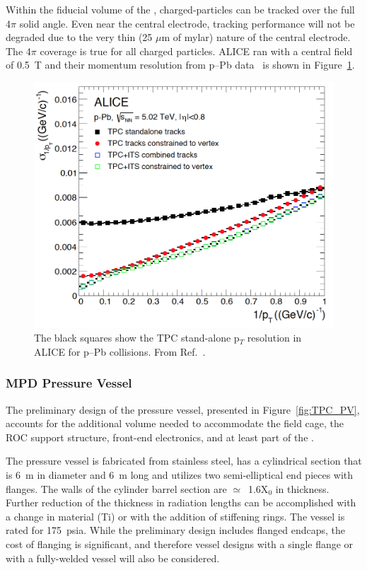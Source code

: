 Within the fiducial volume of the , charged-particles can be tracked over the full 4$\pi$ solid angle.  Even near the central electrode,  tracking performance will not be degraded due to the very thin (25 $\mu$m of mylar) nature of the central electrode.  The 4$\pi$ coverage is true for all charged particles.  ALICE ran with a central field of 0.5~T and their momentum resolution from p--Pb data~\cite{Abelev:2014ffa} is shown in Figure~\ref{fig:ALICE_MOMres}.

\begin{figure}[h]
\centering 
\includegraphics[width=0.85\columnwidth]{graphics/ALICE_mom_res.png} 
\caption{The black squares show the TPC stand-alone p$_T$ resolution in ALICE for p--Pb collisions. From Ref.~\cite{Abelev:2014ffa}.} 
\label{fig:ALICE_MOMres} 
\end{figure}

\subsubsection{MPD Pressure Vessel}\label{sec:TPC_PV}

The preliminary design of the pressure vessel, presented in Figure~\ref{fig:TPC_PV}, accounts for the additional volume needed to accommodate the  field cage, the ROC support structure, front-end electronics, and at least part of the .

The pressure vessel is fabricated from stainless steel, has a cylindrical section that is 6~m in diameter and 6~m long and utilizes two semi-elliptical end pieces with flanges. The walls of the cylinder barrel section are $\simeq$~1.6X$_0$ in thickness.  Further reduction of the thickness in radiation lengths can be accomplished with a change in material (Ti) or with the addition of stiffening rings.  The vessel is rated for 175~psia.  While the preliminary design includes flanged endcaps, the cost of flanging is significant, and therefore vessel designs with a single flange or with a fully-welded vessel will also be considered.  

